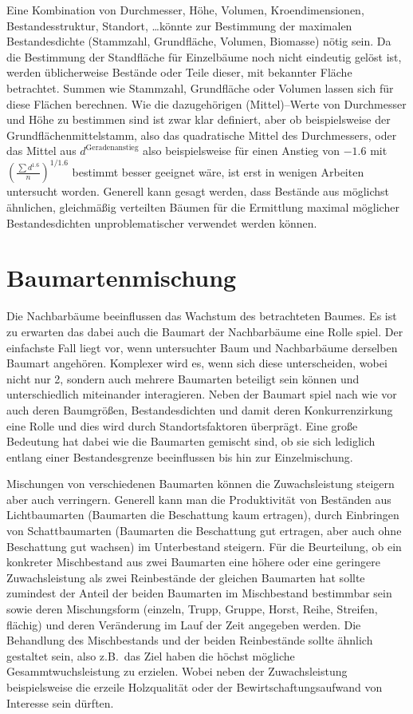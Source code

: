 \documentclass[twocolumn]{scrartcl}
\begin{document}
Eine Kombination von Durchmesser, Höhe, Volumen, Kroendimensionen,
Bestandesstruktur, Standort, \dots könnte zur Bestimmung der maximalen
Bestandesdichte (Stammzahl, Grundfläche, Volumen, Biomasse) nötig sein. Da die
Bestimmung der Standfläche für Einzelbäume noch nicht eindeutig gelöst ist,
werden üblicherweise Bestände oder Teile dieser, mit bekannter Fläche
betrachtet. Summen wie Stammzahl, Grundfläche oder Volumen lassen sich für diese
Flächen berechnen. Wie die dazugehörigen (Mittel)--Werte von Durchmesser und
Höhe zu bestimmen sind ist zwar klar definiert, aber ob beispielsweise der
Grundflächenmittelstamm, also das quadratische Mittel des Durchmessers, oder das
Mittel aus $d^\text{Geradenanstieg}$ also beispielsweise für einen Anstieg von
$-1.6$ mit $\left(\frac{\sum d^{1.6}}{n}\right)^{1/1.6}$ bestimmt besser
geeignet wäre, ist erst in wenigen Arbeiten untersucht worden. Generell kann
gesagt werden, dass Bestände aus möglichst ähnlichen, gleichmäßig verteilten
Bäumen für die Ermittlung maximal möglicher Bestandesdichten unproblematischer
verwendet werden können.

\section{Baumartenmischung}

Die Nachbarbäume beeinflussen das Wachstum des betrachteten Baumes. Es ist zu
erwarten das dabei auch die Baumart der Nachbarbäume eine Rolle spiel. Der
einfachste Fall liegt vor, wenn untersuchter Baum und Nachbarbäume derselben
Baumart angehören. Komplexer wird es, wenn sich diese unterscheiden, wobei nicht
nur 2, sondern auch mehrere Baumarten beteiligt sein können und unterschiedlich
miteinander interagieren. Neben der Baumart spiel nach wie vor auch deren
Baumgrößen, Bestandesdichten und damit deren Konkurrenzirkung eine Rolle und
dies wird durch Standortsfaktoren überprägt. Eine große Bedeutung hat dabei wie
die Baumarten gemischt sind, ob sie sich lediglich entlang einer Bestandesgrenze
beeinflussen bis hin zur Einzelmischung.

Mischungen von verschiedenen Baumarten können die Zuwachsleistung steigern aber
auch verringern. Generell kann man die Produktivität von Beständen aus
Lichtbaumarten (Baumarten die Beschattung kaum ertragen), durch Einbringen von
Schattbaumarten (Baumarten die Beschattung gut ertragen, aber auch ohne
Beschattung gut wachsen) im Unterbestand steigern. Für die Beurteilung, ob ein
konkreter Mischbestand aus zwei Baumarten eine höhere oder eine geringere
Zuwachsleistung als zwei Reinbestände der gleichen Baumarten hat sollte
zumindest der Anteil der beiden Baumarten im Mischbestand bestimmbar sein sowie
deren Mischungsform (einzeln, Trupp, Gruppe, Horst, Reihe, Streifen, flächig)
und deren Veränderung im Lauf der Zeit angegeben werden. Die Behandlung des
Mischbestands und der beiden Reinbestände sollte ähnlich gestaltet sein, also
z.B.\ das Ziel haben die höchst mögliche Gesammtwuchsleistung zu erzielen. Wobei
neben der Zuwachsleistung beispielsweise die erzeile Holzqualität oder der
Bewirtschaftungsaufwand von Interesse sein dürften.

\renewcommand{\indexname}{Stichwortverzeichnis}
\printindex



\end{document}
